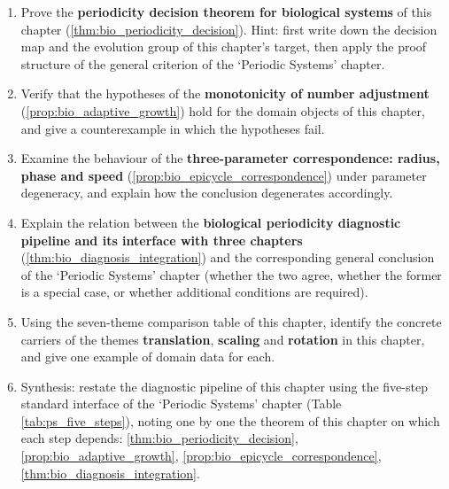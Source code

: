 \begin{enumerate}[leftmargin=3em, label=\textbf{Exercise \arabic*}]
    \item Prove the \textbf{periodicity decision theorem for biological systems} of this chapter (\ref{thm:bio_periodicity_decision}). Hint: first write down the decision map and the evolution group of this chapter's target, then apply the proof structure of the general criterion of the `Periodic Systems' chapter.

    \item Verify that the hypotheses of the \textbf{monotonicity of number adjustment} (\ref{prop:bio_adaptive_growth}) hold for the domain objects of this chapter, and give a counterexample in which the hypotheses fail.

    \item Examine the behaviour of the \textbf{three-parameter correspondence: radius, phase and speed} (\ref{prop:bio_epicycle_correspondence}) under parameter degeneracy, and explain how the conclusion degenerates accordingly.

    \item Explain the relation between the \textbf{biological periodicity diagnostic pipeline and its interface with three chapters} (\ref{thm:bio_diagnosis_integration}) and the corresponding general conclusion of the `Periodic Systems' chapter (whether the two agree, whether the former is a special case, or whether additional conditions are required).

    \item Using the seven-theme comparison table of this chapter, identify the concrete carriers of the themes \textbf{translation}, \textbf{scaling} and \textbf{rotation} in this chapter, and give one example of domain data for each.

    \item Synthesis: restate the diagnostic pipeline of this chapter using the five-step standard interface of the `Periodic Systems' chapter (Table \ref{tab:ps_five_steps}), noting one by one the theorem of this chapter on which each step depends: \ref{thm:bio_periodicity_decision}, \ref{prop:bio_adaptive_growth}, \ref{prop:bio_epicycle_correspondence}, \ref{thm:bio_diagnosis_integration}.
\end{enumerate}

